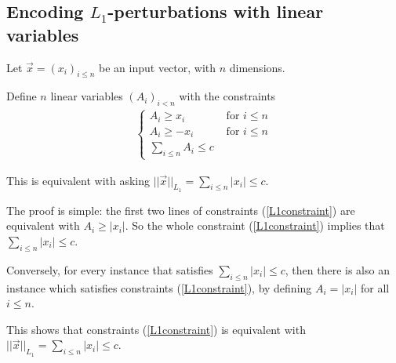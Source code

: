\subsection*{Encoding $L_1$-perturbations with linear variables}

Let $\vec{x}=(x_i)_{i\leq n}$ be an input vector, with $n$ dimensions.

\begin{proposition}
	\label{prop.l1}
Define $n$ linear variables $(A_i)_{i<n}$ with the constraints 
\begin{align}\label{L1constraint}\begin{cases}
	A_i \geq x_i &\text{ for }i \leq n\\ 
	A_i\geq -x_i &\text{ for }i \leq n\\
	\sum_{i\leq n} A_i \leq c	&\end{cases}
\end{align}

This is equivalent with asking $||\vec{x}||_{L_1} = \sum_{i\leq n} |x_i| \leq c$.
\end{proposition}

The proof is simple: the first two lines of constraints (\ref{L1constraint}) are equivalent with $A_i \geq |x_i|$. So the whole constraint (\ref{L1constraint}) 
implies that $\sum_{i\leq n} |x_i| \leq c$.

Conversely, for every instance that satisfies $\sum_{i\leq n} |x_i| \leq c$, then there is also an instance which satisfies constraints (\ref{L1constraint}),  by defining $A_i = |x_i|$ for all $i \leq n$.

This shows that constraints (\ref{L1constraint}) is equivalent with 
$||\vec{x}||_{L_1} = \sum_{i\leq n} |x_i| \leq c$.

